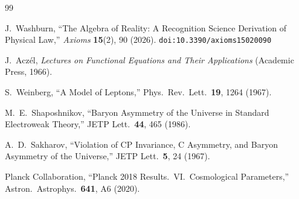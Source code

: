 \documentclass[12pt,a4paper]{article}
\theoremstyle{definition}
\theoremstyle{remark}
\begin{document}
\begin{thebibliography}{99}

J.~Washburn, ``The Algebra of Reality: A Recognition Science Derivation
of Physical Law,'' \emph{Axioms} \textbf{15}(2), 90 (2026).
\texttt{doi:10.3390/axioms15020090}

J.~Acz\'el, \emph{Lectures on Functional Equations and Their
Applications} (Academic Press, 1966).

S.~Weinberg, ``A Model of Leptons,'' Phys.\ Rev.\ Lett.\
\textbf{19}, 1264 (1967).

M.~E.~Shaposhnikov, ``Baryon Asymmetry of the Universe in Standard
Electroweak Theory,'' JETP Lett.\ \textbf{44}, 465 (1986).

A.~D.~Sakharov, ``Violation of CP Invariance, C Asymmetry, and
Baryon Asymmetry of the Universe,'' JETP Lett.\ \textbf{5}, 24
(1967).

Planck Collaboration, ``Planck 2018 Results.\ VI.\ Cosmological
Parameters,'' Astron.\ Astrophys.\ \textbf{641}, A6 (2020).

\end{thebibliography}
\end{document}
